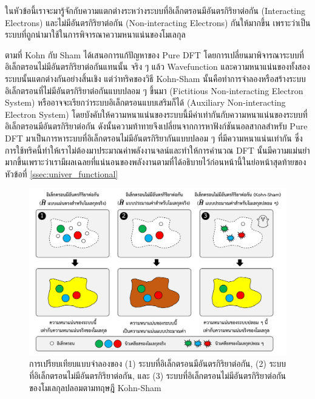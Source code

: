 ในหัวข้อนี้เราจะมารู้จักกับความแตกต่างระหว่างระบบที่อิเล็กตรอนมีอันตรกิริยาต่อกัน (Interacting Electrons) และไม่มีอันตรกิริยาต่อกัน (Non-interacting Electrons) กันให้มากขึ้น เพราะว่าเป็นระบบที่ถูกนำมาใช้ในการพิจารณาความหนาแน่นของโมเลกุล

ตามที่ Kohn กับ Sham ได้เสนอการแก้ปัญหาของ Pure DFT โดยการเปลี่ยนมาพิจารณาระบบที่อิเล็กตรอนไม่มีอันตรกิริยาต่อกันแทนนั้น จริง ๆ แล้ว Wavefunction และความหนาแน่นของทั้งสองระบบนั้นแตกต่างกันอย่างสิ้นเชิง แต่ว่าทริคของวิธี Kohn-Sham นั้นคือทำการจำลองหรือสร้างระบบอิเล็กตรอนที่ไม่มีอันตรกิริยาต่อกันแบบปลอม ๆ ขึ้นมา (Fictitious Non-interacting Electron System) หรืออาจจะเรียกว่าระบบอิเล็กตรอนแบบเสริมก็ได้ (Auxiliary Non-interacting Electron System)\autocite{martin2020} โดยบังคับให้ความหนาแน่นของระบบนี้มีค่าเท่ากันกับความหนาแน่นของระบบที่อิเล็กตรอนมีอันตรกิริยาต่อกัน ดังนั้นความท้าทายจึงเปลี่ยนจากการหาฟังก์ชันนอลสากลสำหรับ Pure DFT มาเป็นการหาระบบที่อิเล็กตรอนไม่มีอันตรกิริยากันแบบปลอม ๆ ที่มีความหนาแน่นเท่ากัน ซึ่งการใช้ทริคนี้ทำให้เราไม่ต้องมาประมาณค่าพลังงานจลน์และทำให้การคำนวณ DFT นั้นมีความแม่นยำมากขึ้นเพราะว่าเรามีผลเฉลยที่แน่นอนของพลังงานตามที่ได้อธิบายไว้ก่อนหน้านี้ในย่อหน้าสุดท้ายของหัวข้อที่ \ref{ssec:univer_functional}

\begin{figure}[H]
    \centering
    \includegraphics[width=\linewidth]{fig/electron_system.png}
    \caption{การเปรียบเทียบแบบจำลองของ (1) ระบบที่อิเล็กตรอนมีอันตรกิริยาต่อกัน, (2) ระบบที่อิเล็กตรอนไม่มีอันตรกิริยาต่อกัน, และ (3) ระบบที่อิเล็กตรอนไม่มีอันตรกิริยาต่อกันของโมเลกุลปลอมตามทฤษฎี Kohn-Sham}
    \label{fig:electron_system}
\end{figure}

